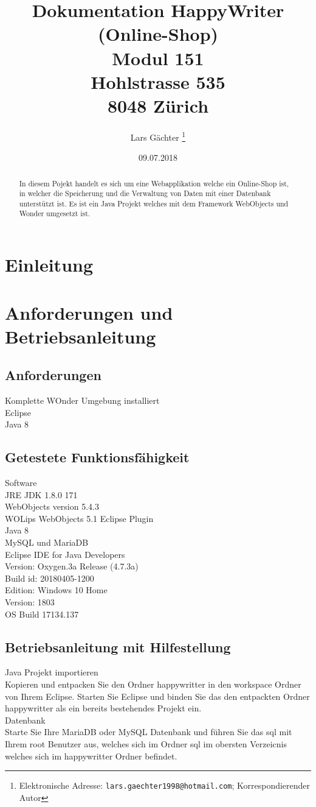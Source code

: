 \documentclass{article}
\title{Dokumentation HappyWriter (Online-Shop)\\ Modul 151\\ Hohlstrasse 535 \\ 8048 Zürich}
\date{09.07.2018}
\author{Lars Gächter
\thanks{Elektronische Adresse: \texttt{lars.gaechter1998@hotmail.com}; Korrespondierender Autor}}
\affil{Stiftung Wirtschaftsinformatikschule Schweiz WISS}
\begin{document}
\maketitle
\clearpage
\tableofcontents
\clearpage 
\begin{abstract}
In diesem Pojekt handelt es sich um eine Webapplikation welche ein Online-Shop ist, in welcher die Speicherung und die Verwaltung von Daten mit einer Datenbank unterstützt ist.
Es ist ein Java Projekt welches mit dem Framework WebObjects und Wonder umgesetzt ist.
\end{abstract}
\section{Einleitung}
\section{Anforderungen und Betriebsanleitung}
\subsection{Anforderungen}
Komplette WOnder Umgebung installiert\\
Eclipse\\
Java 8
\subsection{Getestete Funktionsfähigkeit}
Software\\
JRE JDK 1.8.0 171\\
WebObjects version 5.4.3\\
WOLips WebObjects 5.1 Eclipse Plugin\\
Java 8\\
MySQL und MariaDB\\
Eclipse IDE for Java Developers\\
Version: Oxygen.3a Release (4.7.3a)\\
Build id: 20180405-1200\\
Edition: Windows 10 Home\\
Version: 1803\\
OS Build 17134.137
\subsection{Betriebsanleitung mit Hilfestellung}
Java Projekt importieren\\
Kopieren und entpacken Sie den Ordner happywritter in den workspace Ordner von Ihrem Eclipse.
Starten Sie Eclipse und binden Sie das den entpackten Ordner happywritter als ein bereits bestehendes Projekt ein.\\
Datenbank\\
Starte Sie Ihre MariaDB oder MySQL Datenbank und führen Sie das sql mit Ihrem root Benutzer aus, welches sich im Ordner sql im obersten Verzeicnis welches sich im happywritter Ordner befindet.
\end{document}
